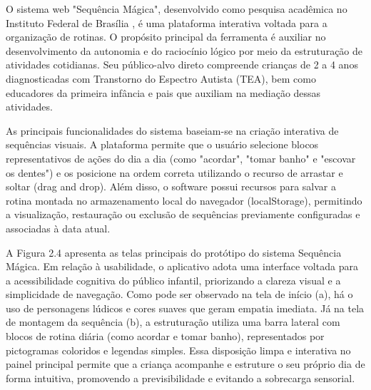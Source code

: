O sistema web "Sequência Mágica", desenvolvido como pesquisa acadêmica no Instituto Federal de Brasília \cite{santos2025}, é uma plataforma interativa voltada para a organização de rotinas. O propósito principal da ferramenta é auxiliar no desenvolvimento da autonomia e do raciocínio lógico por meio da estruturação de atividades cotidianas. Seu público-alvo direto compreende crianças de 2 a 4 anos diagnosticadas com Transtorno do Espectro Autista (TEA), bem como educadores da primeira infância e pais que auxiliam na mediação dessas atividades.

As principais funcionalidades do sistema baseiam-se na criação interativa de sequências visuais. A plataforma permite que o usuário selecione blocos representativos de ações do dia a dia (como "acordar", "tomar banho" e "escovar os dentes") e os posicione na ordem correta utilizando o recurso de arrastar e soltar (drag and drop). Além disso, o software possui recursos para salvar a rotina montada no armazenamento local do navegador (localStorage), permitindo a visualização, restauração ou exclusão de sequências previamente configuradas e associadas à data atual.

A Figura 2.4 apresenta as telas principais do protótipo do sistema Sequência Mágica. Em relação à usabilidade, o aplicativo adota uma interface voltada para a acessibilidade cognitiva do público infantil, priorizando a clareza visual e a simplicidade de navegação. Como pode ser observado na tela de início (a), há o uso de personagens lúdicos e cores suaves que geram empatia imediata. Já na tela de montagem da sequência (b), a estruturação utiliza uma barra lateral com blocos de rotina diária (como acordar e tomar banho), representados por pictogramas coloridos e legendas simples. Essa disposição limpa e interativa no painel principal permite que a criança acompanhe e estruture o seu próprio dia de forma intuitiva, promovendo a previsibilidade e evitando a sobrecarga sensorial.

